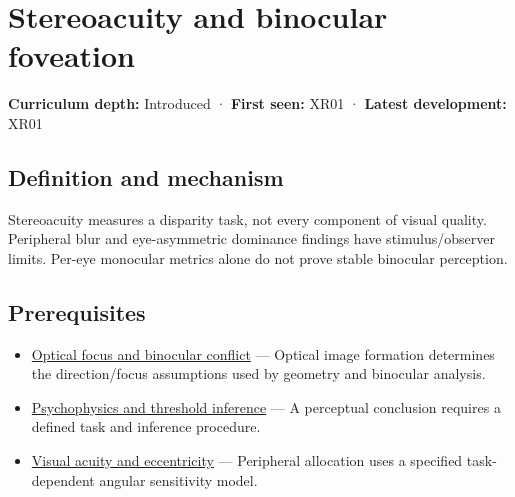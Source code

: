 \hypertarget{appendix-8dc848f14052}{}\label{referencestart:appendix-8dc848f14052}
\section{Stereoacuity and binocular foveation}\label{appendix-8dc848f14052-stereoacuity-and-binocular-foveation}

\hypertarget{appendix-8dc848f14052-stereoacuity-and-binocular-foveation}{}

\textbf{Curriculum depth:} Introduced · \textbf{First seen:} XR01 · \textbf{Latest development:} XR01

\begin{allmightroledefinition}

\subsection{Definition and mechanism}\label{appendix-8dc848f14052-definition-and-mechanism}

\hypertarget{appendix-8dc848f14052-definition-and-mechanism}{}

Stereoacuity measures a disparity task, not every component of visual quality. Peripheral blur and eye-asymmetric dominance findings have stimulus/observer limits. Per-eye monocular metrics alone do not prove stable binocular perception.

\end{allmightroledefinition}

\subsection{Prerequisites}\label{appendix-8dc848f14052-prerequisites}

\hypertarget{appendix-8dc848f14052-prerequisites}{}

\begin{itemize}
\tightlist
\item
  \hyperref[appendix-f90cee1be7a4]{Optical focus and binocular conflict} --- Optical image formation determines the direction/focus assumptions used by geometry and binocular analysis.
\item
  \hyperref[appendix-1759f03e8ce7]{Psychophysics and threshold inference} --- A perceptual conclusion requires a defined task and inference procedure.
\item
  \hyperref[appendix-b491fc48c54b]{Visual acuity and eccentricity} --- Peripheral allocation uses a specified task-dependent angular sensitivity model.
\end{itemize}


